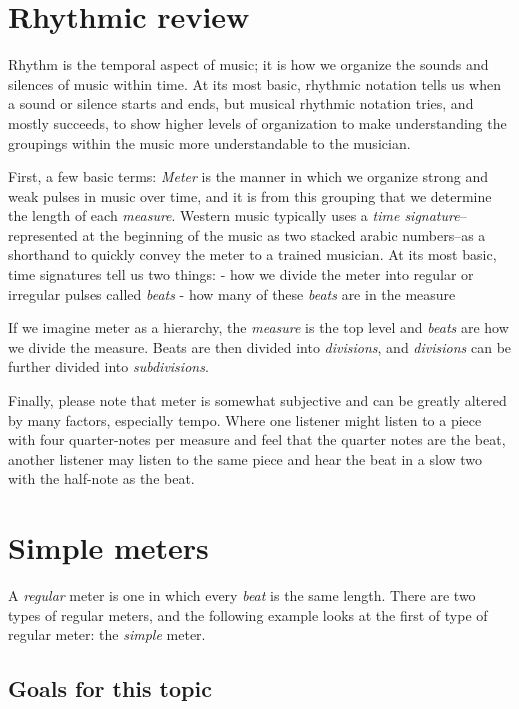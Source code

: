 \documentclass{book}
\begin{document}
\hypertarget{rhythmic-review}{%
\section{Rhythmic review}\label{rhythmic-review}}

Rhythm is the temporal aspect of music; it is how we organize the sounds and
silences of music within time. At its most basic, rhythmic notation tells us
when a sound or silence starts and ends, but musical rhythmic notation tries,
and mostly succeeds, to show higher levels of organization to make
understanding the groupings within the music more understandable to the
musician.

First, a few basic terms: \emph{Meter} is the manner in which we organize
strong and weak pulses in music over time, and it is from this grouping that
we determine the length of each \emph{measure}. Western music typically uses a
\emph{time signature}--represented at the beginning of the music as two
stacked arabic numbers--as a shorthand to quickly convey the meter to a
trained musician. At its most basic, time signatures tell us two things: - how
we divide the meter into regular or irregular pulses called \emph{beats} - how
many of these \emph{beats} are in the measure

If we imagine meter as a hierarchy, the \emph{measure} is the top level and
\emph{beats} are how we divide the measure. Beats are then divided into
\emph{divisions}, and \emph{divisions} can be further divided into
\emph{subdivisions}.

Finally, please note that meter is somewhat subjective and can be greatly
altered by many factors, especially tempo. Where one listener might listen to
a piece with four quarter-notes per measure and feel that the quarter notes
are the beat, another listener may listen to the same piece and hear the beat
in a slow two with the half-note as the beat.

\hypertarget{simple-meters}{%
\section{Simple meters}\label{simple-meters}}

A \emph{regular} meter is one in which every \emph{beat} is the same length.
There are two types of regular meters, and the following example looks at the
first of type of regular meter: the \emph{simple} meter.

\hypertarget{goals-for-this-topic-4}{%
\subsection{Goals for this topic}\label{goals-for-this-topic-4}}
\end{document}
